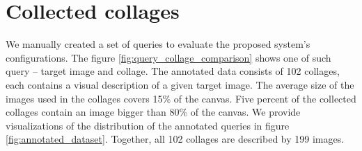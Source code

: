 \section{Collected collages}

We manually created a set of queries to evaluate the proposed system's configurations. The figure \ref{fig:query_collage_comparison} shows one of such query -- target image and collage. The annotated data consists of 102 collages, each contains a visual description of a given target image. The average size of the images used in the collages covers 15\% of the canvas. Five percent of the collected collages contain an image bigger than 80\% of the canvas. We provide visualizations of the distribution of the annotated queries in figure \ref{fig:annotated_dataset}. Together, all 102 collages are described by 199 images.

